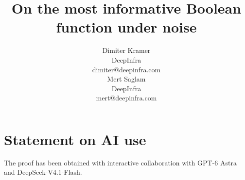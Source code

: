 \documentclass[10pt,letterpaper]{article}
\begin{document}
\title{\vspace{-30px}
\bf\fontsize{15}{19}\selectfont
  On the most informative Boolean function under noise%
  \vspace{-2px}}
\author{\fontsize{10}{12}\selectfont
\begin{minipage}[t]{0.45\textwidth}\centering
Dimiter Kramer\\[1pt]
{\fontsize{9}{11}\selectfont DeepInfra\\
dimiter@deepinfra.com}
\end{minipage}\hfill
\begin{minipage}[t]{0.45\textwidth}\centering
Mert Saglam\\[1pt]
{\fontsize{9}{11}\selectfont DeepInfra\\
mert@deepinfra.com}
\end{minipage}}
\date{}
\maketitle
\vspace{-8px}





\section{Statement on AI use}
The proof has been obtained with interactive collaboration
with GPT-6 Astra and DeepSeek-V4.1-Flash.
\appendix



\printbibliography
\end{document}
